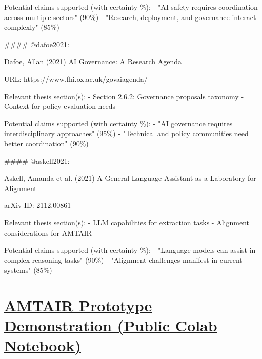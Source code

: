 \documentclass[
  11pt,
  letterpaper,
]{book}
\newenvironment{Shaded}{\begin{snugshade}}{\end{snugshade}}
\newcommand{\FunctionTok}[1]{\textcolor[rgb]{0.28,0.35,0.67}{#1}}
\newcommand{\InformationTok}[1]{\textcolor[rgb]{0.37,0.37,0.37}{#1}}
\begin{document}
\begin{Shaded}
\begin{Highlighting}[]
\InformationTok{    Potential claims supported (with certainty \%):}
\InformationTok{    {-} "AI safety requires coordination across multiple sectors" (90\%)}
\InformationTok{    {-} "Research, deployment, and governance interact complexly" (85\%)}

\FunctionTok{\#\#\#\# \textasciigrave{}@dafoe2021\textasciigrave{}: }

\InformationTok{    Dafoe, Allan (2021)}
\InformationTok{    AI Governance: A Research Agenda}

\InformationTok{    URL: https://www.fhi.ox.ac.uk/govaiagenda/}

\InformationTok{    Relevant thesis section(s):}
\InformationTok{    {-} Section 2.6.2: Governance proposals taxonomy}
\InformationTok{    {-} Context for policy evaluation needs}

\InformationTok{    Potential claims supported (with certainty \%):}
\InformationTok{    {-} "AI governance requires interdisciplinary approaches" (95\%)}
\InformationTok{    {-} "Technical and policy communities need better coordination" (90\%)}

\FunctionTok{\#\#\#\# \textasciigrave{}@askell2021\textasciigrave{}:}

\InformationTok{    Askell, Amanda et al. (2021)}
\InformationTok{    A General Language Assistant as a Laboratory for Alignment}

\InformationTok{    arXiv ID: 2112.00861}

\InformationTok{    Relevant thesis section(s):}
\InformationTok{    {-} LLM capabilities for extraction tasks}
\InformationTok{    {-} Alignment considerations for AMTAIR}

\InformationTok{    Potential claims supported (with certainty \%):}
\InformationTok{    {-} "Language models can assist in complex reasoning tasks" (90\%)}
\InformationTok{    {-} "Alignment challenges manifest in current systems" (85\%)}
\end{Highlighting}
\end{Shaded}

\cleardoublepage
{}
{}
\appendix

\chapter{\texorpdfstring{\href{https://colab.research.google.com/github/SingularitySmith/AMTAIR_Prototype/blob/main/version_history/AMTAIR_Prototype_0_1.3.ipynb\#scrollTo=lt8-AnebGUXr}{AMTAIR
Prototype Demonstration (Public Colab
Notebook)}}{AMTAIR Prototype Demonstration (Public Colab Notebook)}}\label{amtair-prototype-demonstration-public-colab-notebook}
\end{document}
